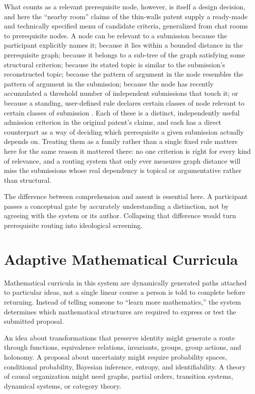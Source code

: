 \documentclass[11pt]{article}
\begin{document}
What counts as a relevant prerequisite node, however, is itself a design decision, and here the ``nearby room'' claims of the thin-walls patent supply a ready-made and technically specified menu of candidate criteria, generalized from chat rooms to prerequisite nodes. A node can be relevant to a submission because the participant explicitly names it; because it lies within a bounded distance in the prerequisite graph; because it belongs to a sub-tree of the graph satisfying some structural criterion; because its stated topic is similar to the submission's reconstructed topic; because the pattern of argument in the node resembles the pattern of argument in the submission; because the node has recently accumulated a threshold number of independent submissions that touch it; or because a standing, user-defined rule declares certain classes of node relevant to certain classes of submission \cite{anderson2011thinwalls}. Each of these is a distinct, independently useful admission criterion in the original patent's claims, and each has a direct counterpart as a way of deciding which prerequisite a given submission actually depends on. Treating them as a family rather than a single fixed rule matters here for the same reason it mattered there: no one criterion is right for every kind of relevance, and a routing system that only ever measures graph distance will miss the submissions whose real dependency is topical or argumentative rather than structural.

The difference between comprehension and assent is essential here. A participant passes a conceptual gate by accurately understanding a distinction, not by agreeing with the system or its author. Collapsing that difference would turn prerequisite routing into ideological screening.

\section{Adaptive Mathematical Curricula}

Mathematical curricula in this system are dynamically generated paths attached to particular ideas, not a single linear course a person is told to complete before returning. Instead of telling someone to ``learn more mathematics,'' the system determines which mathematical structures are required to express or test the submitted proposal.

An idea about transformations that preserve identity might generate a route through functions, equivalence relations, invariants, groups, group actions, and holonomy. A proposal about uncertainty might require probability spaces, conditional probability, Bayesian inference, entropy, and identifiability. A theory of causal organization might need graphs, partial orders, transition systems, dynamical systems, or category theory.
\end{document}
